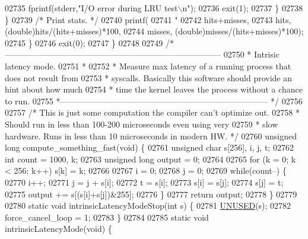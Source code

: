 \begin{DoxyCode}
{{{{{{{{{{{{{{{{{{{{{{{{{{{{{{{{{{{{{{{{{{{{{{{{{{{{{{{{{{{{{{{{{{{{{{{{{{{{{{{{{{{{{{{{{{{{{{{{{{{{{{{{{{{{{{{02735                 fprintf(stderr,\textcolor{stringliteral}{"I/O error during LRU test\(\backslash\)n"});
02736                 exit(1);
02737             \}
02738         \}
02739         \textcolor{comment}{/* Print stats. */}
02740         printf(
02741             \textcolor{stringliteral}{"%
02742             hits+misses,
02743             hits, (\textcolor{keywordtype}{double})hits/(hits+misses)*100,
02744             misses, (\textcolor{keywordtype}{double})misses/(hits+misses)*100);
02745     \}
02746     exit(0);
02747 \}
02748 
02749 \textcolor{comment}{/*------------------------------------------------------------------------------}
02750 \textcolor{comment}{ * Intrisic latency mode.}
02751 \textcolor{comment}{ *}
02752 \textcolor{comment}{ * Measure max latency of a running process that does not result from}
02753 \textcolor{comment}{ * syscalls. Basically this software should provide an hint about how much}
02754 \textcolor{comment}{ * time the kernel leaves the process without a chance to run.}
02755 \textcolor{comment}{ *--------------------------------------------------------------------------- */}
02756 
02757 \textcolor{comment}{/* This is just some computation the compiler can't optimize out.}
02758 \textcolor{comment}{ * Should run in less than 100-200 microseconds even using very}
02759 \textcolor{comment}{ * slow hardware. Runs in less than 10 microseconds in modern HW. */}
02760 \textcolor{keywordtype}{unsigned} \textcolor{keywordtype}{long} compute\_something\_fast(\textcolor{keywordtype}{void}) \{
02761     \textcolor{keywordtype}{unsigned} \textcolor{keywordtype}{char} s[256], i, j, t;
02762     \textcolor{keywordtype}{int} count = 1000, k;
02763     \textcolor{keywordtype}{unsigned} \textcolor{keywordtype}{long} output = 0;
02764 
02765     \textcolor{keywordflow}{for} (k = 0; k < 256; k++) s[k] = k;
02766 
02767     i = 0;
02768     j = 0;
02769     \textcolor{keywordflow}{while}(count--) \{
02770         i++;
02771         j = j + s[i];
02772         t = s[i];
02773         s[i] = s[j];
02774         s[j] = t;
02775         output += s[(s[i]+s[j])&255];
02776     \}
02777     \textcolor{keywordflow}{return} output;
02778 \}
02779 
02780 \textcolor{keyword}{static} \textcolor{keywordtype}{void} intrinsicLatencyModeStop(\textcolor{keywordtype}{int} s) \{
02781     \hyperlink{server_8h_ae7c9dc8f13568a9c856573751f1ee1ec}{UNUSED}(s);
02782     force\_cancel\_loop = 1;
02783 \}
02784 
02785 \textcolor{keyword}{static} \textcolor{keywordtype}{void} intrinsicLatencyMode(\textcolor{keywordtype}{void}) \{
}}}}}}}}}}}}}}}}}}}}}}}}}}}}}}}}}}}}}}}}}}}}}}}}}}}}}}}}}}}}}}}}}}}}}}}}}}}}}}}}}}}}}}}}}}}}}}}}}}}}}}}}}}}}}}}}
\end{DoxyCode}
